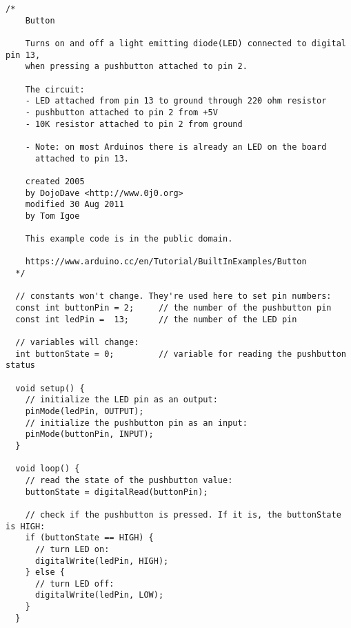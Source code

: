   \begin{lstlisting}[style=cFrameTB, gobble=4]
  /*
    Button
  
    Turns on and off a light emitting diode(LED) connected to digital pin 13,
    when pressing a pushbutton attached to pin 2.
  
    The circuit:
    - LED attached from pin 13 to ground through 220 ohm resistor
    - pushbutton attached to pin 2 from +5V
    - 10K resistor attached to pin 2 from ground
  
    - Note: on most Arduinos there is already an LED on the board
      attached to pin 13.
  
    created 2005
    by DojoDave <http://www.0j0.org>
    modified 30 Aug 2011
    by Tom Igoe
  
    This example code is in the public domain.
  
    https://www.arduino.cc/en/Tutorial/BuiltInExamples/Button
  */
  
  // constants won't change. They're used here to set pin numbers:
  const int buttonPin = 2;     // the number of the pushbutton pin
  const int ledPin =  13;      // the number of the LED pin
  
  // variables will change:
  int buttonState = 0;         // variable for reading the pushbutton status
  
  void setup() {
    // initialize the LED pin as an output:
    pinMode(ledPin, OUTPUT);
    // initialize the pushbutton pin as an input:
    pinMode(buttonPin, INPUT);
  }
  
  void loop() {
    // read the state of the pushbutton value:
    buttonState = digitalRead(buttonPin);
  
    // check if the pushbutton is pressed. If it is, the buttonState is HIGH:
    if (buttonState == HIGH) {
      // turn LED on:
      digitalWrite(ledPin, HIGH);
    } else {
      // turn LED off:
      digitalWrite(ledPin, LOW);
    }
  }
  \end{lstlisting}

